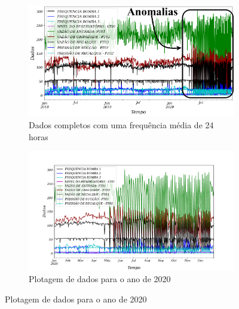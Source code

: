 \begin{figure}[H]
	\centering
	\caption{Detecção de anomalias}
	\begin{subfigure}{0.9\textwidth}	
		\includegraphics[width=\linewidth]{"Introducao/Figuras/dados todos"}	
		\caption{Dados completos com uma frequência média de 24 horas}
		\label{fig:dados-todos}		
	\end{subfigure}
	
	\begin{subfigure}{0.9\textwidth}
		\includegraphics[width=\linewidth]{"Introducao/Figuras/2020 a frente"}
		\caption{Plotagem de dados para o ano de 2020}
		\label{fig:2020-a-frente}
	\end{subfigure}
	
\end{figure}





